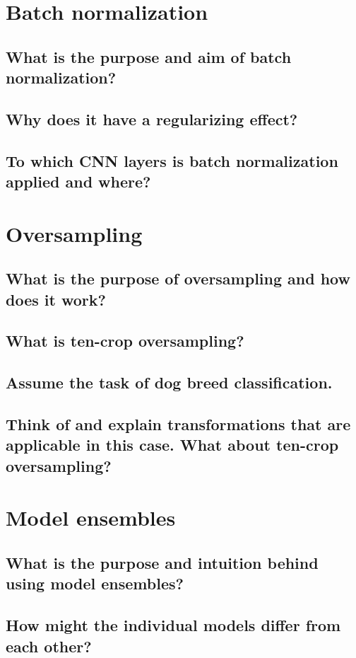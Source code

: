 \section{Batch normalization}
\subsection{What is the purpose and aim of batch normalization?}
\subsection{Why does it have a regularizing effect?}
\subsection{To which CNN layers is batch normalization applied and where?}

\section{Oversampling}
\subsection{What is the purpose of oversampling and how does it work?}
\subsection{What is ten-crop oversampling?}
\subsection{Assume the task of dog breed classification.}
\subsection{Think of and explain transformations that are applicable in this case. What about ten-crop oversampling?}

\section{Model ensembles}
\subsection{What is the purpose and intuition behind using model ensembles?}
\subsection{How might the individual models differ from each other?}
